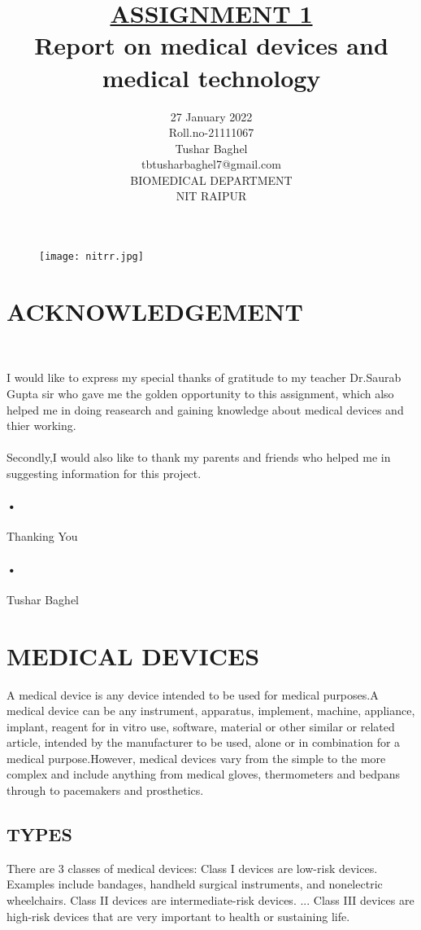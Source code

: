 \documentclass[12pt]{report}
\title{\underline{ASSIGNMENT 1} \\
Report on medical devices and medical technology }
\author{27 January 2022\\ Roll.no-21111067\\Tushar Baghel\\tbtusharbaghel7@gmail.com\\BIOMEDICAL DEPARTMENT\\NIT RAIPUR\\}
\begin{document}
\begin{figure}
\centering
\texttt{[image: nitrr.jpg]}
\end{figure}
\maketitle
\clearpage
\tableofcontents
\clearpage

\section{ACKNOWLEDGEMENT}\


I would like to express my special thanks of gratitude to my teacher Dr.Saurab Gupta sir who gave me the golden opportunity to this assignment, which also helped me in doing reasearch and gaining knowledge about medical devices and thier working.\paragraph{}

Secondly,I would also like to thank my parents and friends who helped me in suggesting information for this project.\paragraph{•}


Thanking You\paragraph{•}

Tushar Baghel 

\clearpage

\section{MEDICAL DEVICES}
A medical device is any device intended to be used for medical purposes.A medical device can be any instrument, apparatus, implement, machine, appliance, implant, reagent for in vitro use, software, material or other similar or related article, intended by the manufacturer to be used, alone or in combination for a medical purpose.However, medical devices vary from the simple to the more complex and include anything from medical gloves, thermometers and bedpans through to pacemakers and prosthetics.

\subsection{TYPES}
There are 3 classes of medical devices:
Class I devices are low-risk devices. Examples include bandages, handheld surgical instruments, and nonelectric wheelchairs.
Class II devices are intermediate-risk devices. ...
Class III devices are high-risk devices that are very important to health or sustaining life.
\end{document}
